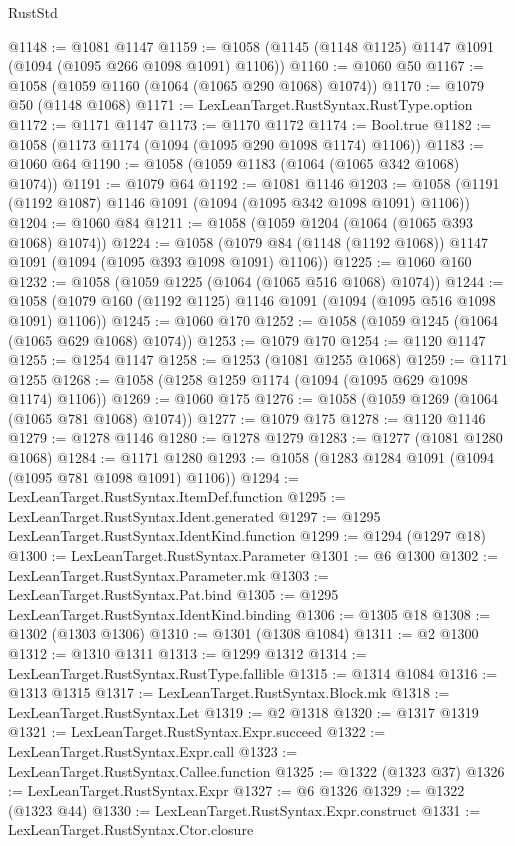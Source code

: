 \begin{lexlean}{RustStd}
\begin{coremodule}
@1148 := @1081 @1147
@1159 := @1058 (@1145 (@1148 @1125) @1147 @1091 (@1094 (@1095 @266 @1098 @1091) @1106))
@1160 := @1060 @50
@1167 := @1058 (@1059 @1160 (@1064 (@1065 @290 @1068) @1074))
@1170 := @1079 @50 (@1148 @1068)
@1171 := LexLeanTarget.RustSyntax.RustType.option
@1172 := @1171 @1147
@1173 := @1170 @1172
@1174 := Bool.true
@1182 := @1058 (@1173 @1174 (@1094 (@1095 @290 @1098 @1174) @1106))
@1183 := @1060 @64
@1190 := @1058 (@1059 @1183 (@1064 (@1065 @342 @1068) @1074))
@1191 := @1079 @64
@1192 := @1081 @1146
@1203 := @1058 (@1191 (@1192 @1087) @1146 @1091 (@1094 (@1095 @342 @1098 @1091) @1106))
@1204 := @1060 @84
@1211 := @1058 (@1059 @1204 (@1064 (@1065 @393 @1068) @1074))
@1224 := @1058 (@1079 @84 (@1148 (@1192 @1068)) @1147 @1091 (@1094 (@1095 @393 @1098 @1091) @1106))
@1225 := @1060 @160
@1232 := @1058 (@1059 @1225 (@1064 (@1065 @516 @1068) @1074))
@1244 := @1058 (@1079 @160 (@1192 @1125) @1146 @1091 (@1094 (@1095 @516 @1098 @1091) @1106))
@1245 := @1060 @170
@1252 := @1058 (@1059 @1245 (@1064 (@1065 @629 @1068) @1074))
@1253 := @1079 @170
@1254 := @1120 @1147
@1255 := @1254 @1147
@1258 := @1253 (@1081 @1255 @1068)
@1259 := @1171 @1255
@1268 := @1058 (@1258 @1259 @1174 (@1094 (@1095 @629 @1098 @1174) @1106))
@1269 := @1060 @175
@1276 := @1058 (@1059 @1269 (@1064 (@1065 @781 @1068) @1074))
@1277 := @1079 @175
@1278 := @1120 @1146
@1279 := @1278 @1146
@1280 := @1278 @1279
@1283 := @1277 (@1081 @1280 @1068)
@1284 := @1171 @1280
@1293 := @1058 (@1283 @1284 @1091 (@1094 (@1095 @781 @1098 @1091) @1106))
@1294 := LexLeanTarget.RustSyntax.ItemDef.function
@1295 := LexLeanTarget.RustSyntax.Ident.generated
@1297 := @1295 LexLeanTarget.RustSyntax.IdentKind.function
@1299 := @1294 (@1297 @18)
@1300 := LexLeanTarget.RustSyntax.Parameter
@1301 := @6 @1300
@1302 := LexLeanTarget.RustSyntax.Parameter.mk
@1303 := LexLeanTarget.RustSyntax.Pat.bind
@1305 := @1295 LexLeanTarget.RustSyntax.IdentKind.binding
@1306 := @1305 @18
@1308 := @1302 (@1303 @1306)
@1310 := @1301 (@1308 @1084)
@1311 := @2 @1300
@1312 := @1310 @1311
@1313 := @1299 @1312
@1314 := LexLeanTarget.RustSyntax.RustType.fallible
@1315 := @1314 @1084
@1316 := @1313 @1315
@1317 := LexLeanTarget.RustSyntax.Block.mk
@1318 := LexLeanTarget.RustSyntax.Let
@1319 := @2 @1318
@1320 := @1317 @1319
@1321 := LexLeanTarget.RustSyntax.Expr.succeed
@1322 := LexLeanTarget.RustSyntax.Expr.call
@1323 := LexLeanTarget.RustSyntax.Callee.function
@1325 := @1322 (@1323 @37)
@1326 := LexLeanTarget.RustSyntax.Expr
@1327 := @6 @1326
@1329 := @1322 (@1323 @44)
@1330 := LexLeanTarget.RustSyntax.Expr.construct
@1331 := LexLeanTarget.RustSyntax.Ctor.closure

\end{coremodule}
\end{lexlean}
